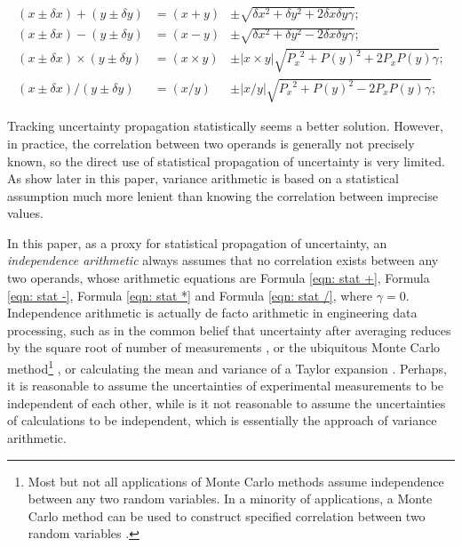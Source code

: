 \documentclass[twoside]{article}
\numberwithin{equation}{section}
\begin{document}
\begin{align}
\label{eqn: stat +} 
(x \pm \delta x) + (y \pm \delta y) & = (x + y) & \pm \sqrt{\delta x^{2} + \delta y^{2} + 2 \delta x \delta y \gamma}; \\
\label{eqn: stat -} 
(x \pm \delta x) - (y \pm \delta y) & = (x - y) & \pm \sqrt{\delta x^{2} + \delta y^{2} - 2 \delta x \delta y \gamma}; \\
\label{eqn: stat *} 
(x \pm \delta x) \times (y \pm \delta y) & = (x \times y) & \pm |x \times y| \sqrt{{P_x}^2 + {P(y)}^2 + 2 P_x P(y) \gamma}; \\
\label{eqn: stat /} 
(x \pm \delta x) / (y \pm \delta y) & = (x/y) & \pm |x / y| \sqrt{{P_x}^2 + {P(y)}^2 - 2 P_x P(y) \gamma};
\end{align}

Tracking uncertainty propagation statistically seems a better solution.  
However, in practice, the correlation between two operands is generally not precisely known, so the direct use of statistical propagation of uncertainty is very limited.  
As show later in this paper, variance arithmetic is based on a statistical assumption much more lenient than knowing the correlation between imprecise values.

In this paper, as a proxy for statistical propagation of uncertainty, an \emph{independence arithmetic} always assumes that no correlation exists between any two operands, whose arithmetic equations are Formula \eqref{eqn: stat +}, Formula \eqref{eqn: stat -}, Formula \eqref{eqn: stat *} and Formula \eqref{eqn: stat /}, where $\gamma=0$.  
Independence arithmetic is actually de facto arithmetic in engineering data processing, such as in the common belief that uncertainty after averaging reduces by the square root of number of measurements \cite{Statistical_Methods}\cite{Precisions_Physical_Measurements}, or the ubiquitous Monte Carlo method\footnote{Most but not all applications of Monte Carlo methods assume independence between any two random variables.  
In a minority of applications, a Monte Carlo method can be used to construct specified correlation between two random variables \cite{Monte_Carlo_Statistics}.} \cite{Monte_Carlo_Method}\cite{Monte_Carlo_Statistics}, or calculating the mean and variance of a Taylor expansion \cite{Taylor_Expansion_Uncertainty}.  
Perhaps, it is reasonable to assume the uncertainties of experimental measurements to be independent of each other, while is it not reasonable to assume the uncertainties of calculations to be independent, which is essentially the approach of variance arithmetic.
\end{document}
